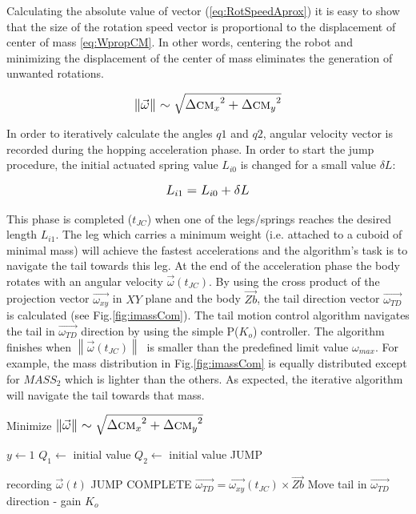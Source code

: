 Calculating the absolute value of vector (\ref{eq:RotSpeedAprox}) it is easy to show that the size of the rotation speed vector is proportional to the displacement of center of mass \eqref{eq:WpropCM}. In other words, centering the robot and minimizing the displacement of the center of mass eliminates the generation of unwanted rotations. 

\begin{equation}\label{eq:WpropCM}
\left \| \vec{\omega} \right \|\sim \sqrt{{\Delta \textsc{cm}_x}^2+{\Delta \textsc{cm}_y}^2}
\end{equation}


In order to iteratively calculate the angles $q1$ and $q2$, angular velocity vector is recorded during the hopping acceleration phase. In order to start the jump procedure, the initial actuated spring value $L_{i0}$ is changed for a small value $\delta L$:

\begin{equation}
\tiny
L_{i1}=L_{i0}+\delta L
\normalsize
\end{equation}  

This phase is completed ($t_{JC}$) when one of the legs/springs reaches the desired length $L_{i1}$. The leg which carries a minimum weight (i.e. attached to a cuboid of minimal mass) will achieve the fastest accelerations and the algorithm’s task is to navigate the tail towards this leg. At the end of the acceleration phase the body rotates with an angular velocity $\vec{\omega}(t_{JC})$. By using the cross product of the projection vector $\vec{\omega_{xy}}$ in $XY$ plane and the body $\vec{Zb}$, the tail direction vector $\vec{\omega_{TD}}$ is calculated (see Fig.\ref{fig:imassCom}). The tail motion control algorithm navigates the tail in $\vec{\omega_{TD}}$ direction by using the simple P($K_o$) controller. The algorithm finishes when $\left \| \vec{\omega}(t_{JC}) \right \|\ $ is smaller than the  predefined limit value $\omega_{max}$.  For example, the mass distribution in Fig.\ref{fig:imassCom} is equally distributed except for $MASS_2$  which is lighter than the others. As expected, the iterative algorithm will navigate the tail towards that mass.



\begin{algorithm}
\caption{Minimize $\left \| \vec{\omega} \right \|\sim \sqrt{{\Delta \textsc{cm}_x}^2+{\Delta \textsc{cm}_y}^2}$}
\begin{algorithmic} 
\STATE $y \leftarrow 1$
\REPEAT
\STATE $Q_1 \leftarrow$ initial value
\STATE $Q_2 \leftarrow$ initial value
\STATE JUMP

\REPEAT
\STATE recording $\vec{\omega}(t)$
\UNTIL JUMP COMPLETE
\STATE $\vec{\omega_{TD}} = \vec{\omega_{xy}}(t_{JC}) \times \vec{Zb}$
\STATE Move tail in $\vec{\omega_{TD}}$ direction - gain $K_o$
\end{algorithmic}
\end{algorithm}


